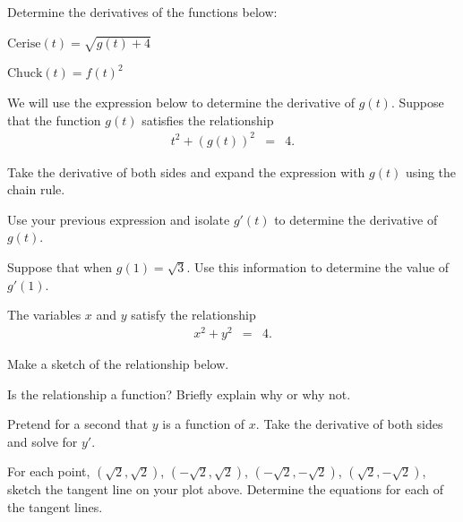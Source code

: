 \begin{problem}
\item Determine the derivatives of the functions below:

  \begin{subproblem}
    \item  ${\displaystyle \mathrm{Cerise}(t)=\sqrt{g(t)+4}}$
      \vfill

    \item  ${\displaystyle \mathrm{Chuck}(t)=f(t)^2}$
        \vfill

  \end{subproblem}

  \item We will use the expression below to determine the derivative of $g(t)$.
    Suppose that the function $g(t)$ satisfies the relationship
    \begin{eqnarray*}
      t^2 + \left(g(t)\right)^2 & = & 4.
    \end{eqnarray*}
    \begin{subproblem}
      \item  Take the derivative of both sides and expand the expression with $g(t)$ using the chain rule.
        \vfill
      \item Use your previous expression and isolate $g'(t)$ to determine the derivative of $g(t)$.
        \vfill
      \item Suppose that when $g(1)=\sqrt{3}$. Use this information to determine the value of $g'(1)$.
        \vfill
    \end{subproblem}

  \clearpage

  \item The variables $x$ and $y$ satisfy the relationship
  \begin{eqnarray*}
    x^2 + y^2 & = & 4.
  \end{eqnarray*}
  \begin{subproblem}
    \item Make a sketch of the relationship below.
      \vfill
    \item Is the relationship a function? Briefly explain why or why not.
      \vspace{2em}
    \item Pretend for a second that $y$ is a function of $x$. Take the derivative
      of both sides and solve for $y'$.
      \vfill
    \item For each point, $(\sqrt{2},\sqrt{2})$, $(-\sqrt{2},\sqrt{2})$,
      $(-\sqrt{2},-\sqrt{2})$, $(\sqrt{2},-\sqrt{2})$, sketch the tangent line
      on your plot above. Determine the equations for each of the tangent lines.
      \vfill
      \vfill
  \end{subproblem}

\end{problem}

